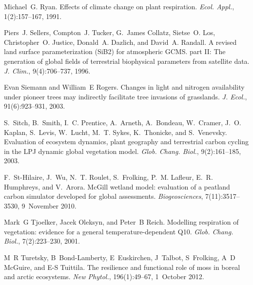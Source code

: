 \begin{DoxyDescription}
\item[\label{_CITEREF_Ryan1991-ai}%
\mbox{[}65\mbox{]}]Michael~G. Ryan. Effects of climate change on plant respiration. {\itshape Ecol. Appl.}, 1(2)\+:157--167, 1991. 


\item[\label{_CITEREF_Sellers1996-bh}%
\mbox{[}66\mbox{]}]Piers~J. Sellers, Compton~J. Tucker, G.~James Collatz, Sietse~O. Los, Christopher~O. Justice, Donald~A. Dazlich, and David~A. Randall. A revised land surface parameterization (Si\+B2) for atmospheric G\+C\+M\+S. part I\+I\+: The generation of global fields of terrestrial biophysical parameters from satellite data. {\itshape J. Clim.}, 9(4)\+:706--737, 1996. 


\item[\label{_CITEREF_Siemann2003-jl}%
\mbox{[}67\mbox{]}]Evan Siemann and William~E Rogers. Changes in light and nitrogen availability under pioneer trees may indirectly facilitate tree invasions of grasslands. {\itshape J. Ecol.}, 91(6)\+:923--931, 2003. 


\item[\label{_CITEREF_Sitch2003-847}%
\mbox{[}68\mbox{]}]S.~Sitch, B.~Smith, I.~C. Prentice, A.~Arneth, A.~Bondeau, W.~Cramer, J.~O. Kaplan, S.~Levis, W.~Lucht, M.~T. Sykes, K.~Thonicke, and S.~Venevsky. Evaluation of ecosystem dynamics, plant geography and terrestrial carbon cycling in the L\+P\+J dynamic global vegetation model. {\itshape Glob. Chang. Biol.}, 9(2)\+:161--185, 2003. 


\item[\label{_CITEREF_St-Hilaire2010-5e9}%
\mbox{[}69\mbox{]}]F.~St-\/\+Hilaire, J.~Wu, N.~T. Roulet, S.~Frolking, P.~M. Lafleur, E.~R. Humphreys, and V.~Arora. Mc\+Gill wetland model\+: evaluation of a peatland carbon simulator developed for global assessments. {\itshape Biogeosciences}, 7(11)\+:3517--3530, 9~November 2010. 


\item[\label{_CITEREF_Tjoelker2001-uz}%
\mbox{[}70\mbox{]}]Mark~G Tjoelker, Jacek Oleksyn, and Peter~B Reich. Modelling respiration of vegetation\+: evidence for a general temperature-\/dependent Q10. {\itshape Glob. Chang. Biol.}, 7(2)\+:223--230, 2001.


\item[\label{_CITEREF_Turetsky2012-qh}%
\mbox{[}71\mbox{]}]M~R Turetsky, B~Bond-\/\+Lamberty, E~Euskirchen, J~Talbot, S~Frolking, A~D Mc\+Guire, and E-\/\+S Tuittila. The resilience and functional role of moss in boreal and arctic ecosystems. {\itshape New Phytol.}, 196(1)\+:49--67, 1~October 2012. 



\end{DoxyDescription}
